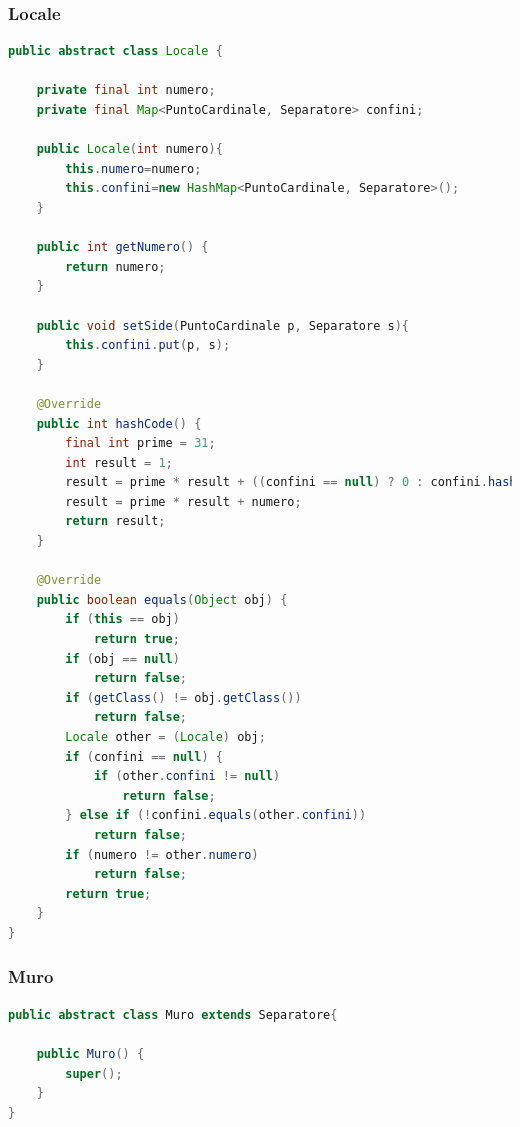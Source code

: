 \documentclass{article}
\begin{document}
\subsubsection{Locale}
\begin{lstlisting}[language=Java]
public abstract class Locale {
	
	private final int numero;
	private final Map<PuntoCardinale, Separatore> confini;
	
	public Locale(int numero){
		this.numero=numero;
		this.confini=new HashMap<PuntoCardinale, Separatore>();
	}

	public int getNumero() {
		return numero;
	}
	
	public void setSide(PuntoCardinale p, Separatore s){
		this.confini.put(p, s);
	}

	@Override
	public int hashCode() {
		final int prime = 31;
		int result = 1;
		result = prime * result + ((confini == null) ? 0 : confini.hashCode());
		result = prime * result + numero;
		return result;
	}

	@Override
	public boolean equals(Object obj) {
		if (this == obj)
			return true;
		if (obj == null)
			return false;
		if (getClass() != obj.getClass())
			return false;
		Locale other = (Locale) obj;
		if (confini == null) {
			if (other.confini != null)
				return false;
		} else if (!confini.equals(other.confini))
			return false;
		if (numero != other.numero)
			return false;
		return true;
	}
}
\end{lstlisting}

\subsubsection{Muro}
\begin{lstlisting}[language=Java]
public abstract class Muro extends Separatore{

	public Muro() {
		super();
	}
}
\end{lstlisting}
\end{document}
